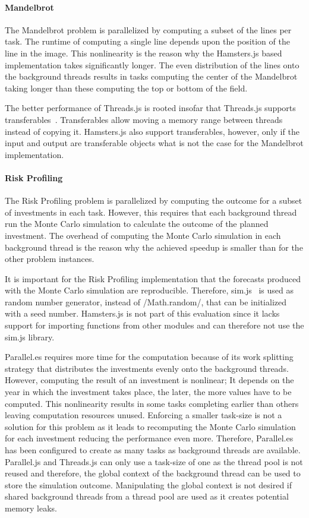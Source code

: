 \paragraph{Mandelbrot}
The Mandelbrot problem is parallelized by computing a subset of the lines per task. The runtime of computing a single line depends upon the position of the line in the image. This nonlinearity is the reason why the Hamsters.js based implementation takes significantly longer. The even distribution of the lines onto the background threads results in tasks computing the center of the Mandelbrot taking longer than these computing the top or bottom of the field. 

The better performance of Threads.js is rooted insofar that Threads.js supports transferables~\cite[Section 2.7.4]{w3cHtml5}. Transferables allow moving a memory range between threads instead of copying it. Hamsters.js also support transferables, however, only if the input and output are transferable objects what is not the case for the Mandelbrot implementation.

\paragraph{Risk Profiling}
The Risk Profiling problem is parallelized by computing the outcome for a subset of investments in each task. However, this requires that each background thread run the Monte Carlo simulation to calculate the outcome of the planned investment. The overhead of computing the Monte Carlo simulation in each background thread is the reason why the achieved speedup is smaller than for the other problem instances. 

It is important for the Risk Profiling implementation that the forecasts produced with the Monte Carlo simulation are reproducible. Therefore, sim.js~\cite{simjs} is used as random number generator, instead of \javascriptinline/Math.random/, that can be initialized with a seed number. Hamsters.js is not part of this evaluation since it lacks support for importing functions from other modules and can therefore not use the sim.js library. 

Parallel.es requires more time for the computation because of its work splitting strategy that distributes the investments evenly onto the background threads. However, computing the result of an investment is nonlinear; It depends on the year in which the investment takes place, the later, the more values have to be computed. This nonlinearity results in some tasks completing earlier than others leaving computation resources unused. Enforcing a smaller task-size is not a solution for this problem as it leads to recomputing the Monte Carlo simulation for each investment reducing the performance even more. Therefore, Parallel.es has been configured to create as many tasks as background threads are available. Parallel.js and Threads.js can only use a task-size of one as the thread pool is not reused and therefore, the global context of the background thread can be used to store the simulation outcome. Manipulating the global context is not desired if shared background threads from a thread pool are used as it creates potential memory leaks.

